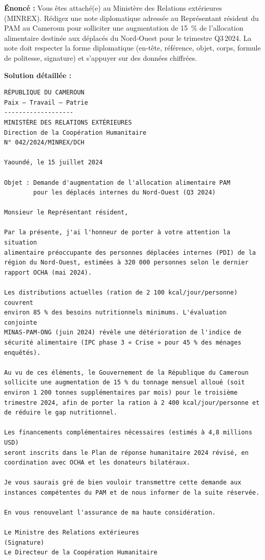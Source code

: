 \documentclass[11pt]{article}
\begin{document}
\begin{exoresolu}
\textbf{Énoncé :} Vous êtes attaché(e) au Ministère des Relations extérieures (MINREX). Rédigez une note diplomatique adressée au Représentant résident du PAM au Cameroun pour solliciter une augmentation de 15~\% de l'allocation alimentaire destinée aux déplacés du Nord‑Ouest pour le trimestre Q3 2024. La note doit respecter la forme diplomatique (en‑tête, référence, objet, corps, formule de politesse, signature) et s'appuyer sur des données chiffrées.

\textbf{Solution détaillée :}

\begin{verbatim}
RÉPUBLIQUE DU CAMEROUN
Paix – Travail – Patrie
-------------------
MINISTÈRE DES RELATIONS EXTÉRIEURES
Direction de la Coopération Humanitaire
N° 042/2024/MINREX/DCH

Yaoundé, le 15 juillet 2024

Objet : Demande d'augmentation de l'allocation alimentaire PAM
        pour les déplacés internes du Nord‑Ouest (Q3 2024)

Monsieur le Représentant résident,

Par la présente, j'ai l'honneur de porter à votre attention la situation
alimentaire préoccupante des personnes déplacées internes (PDI) de la
région du Nord‑Ouest, estimées à 320 000 personnes selon le dernier
rapport OCHA (mai 2024).

Les distributions actuelles (ration de 2 100 kcal/jour/personne) couvrent
environ 85 % des besoins nutritionnels minimums. L'évaluation conjointe
MINAS‑PAM‑ONG (juin 2024) révèle une détérioration de l'indice de
sécurité alimentaire (IPC phase 3 « Crise » pour 45 % des ménages
enquêtés).

Au vu de ces éléments, le Gouvernement de la République du Cameroun
sollicite une augmentation de 15 % du tonnage mensuel alloué (soit
environ 1 200 tonnes supplémentaires par mois) pour le troisième
trimestre 2024, afin de porter la ration à 2 400 kcal/jour/personne et
de réduire le gap nutritionnel.

Les financements complémentaires nécessaires (estimés à 4,8 millions USD)
seront inscrits dans le Plan de réponse humanitaire 2024 révisé, en
coordination avec OCHA et les donateurs bilatéraux.

Je vous saurais gré de bien vouloir transmettre cette demande aux
instances compétentes du PAM et de nous informer de la suite réservée.

En vous renouvelant l'assurance de ma haute considération.

Le Ministre des Relations extérieures
(Signature)
Le Directeur de la Coopération Humanitaire
\end{verbatim}
\end{exoresolu}
\end{document}
